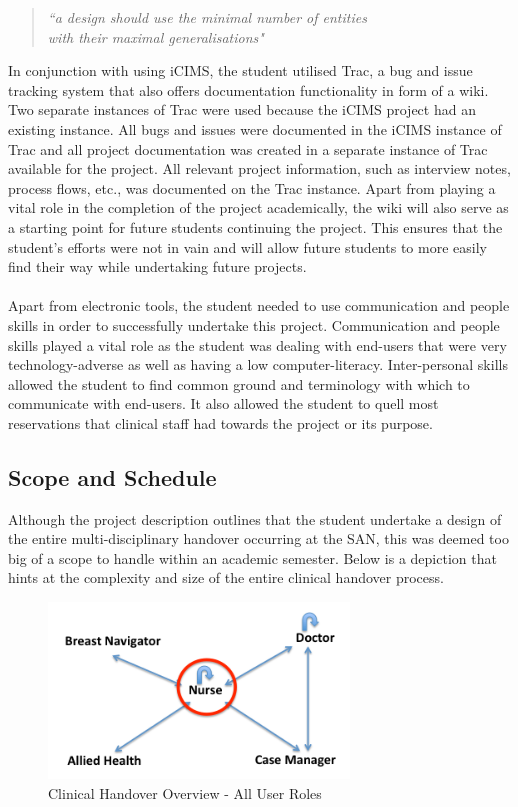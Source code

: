 \begin{quote}
\center\emph{``a design should use the minimal number of entities \\ with their maximal generalisations"}
\end{quote}
\vspace{6mm}
\noindent In conjunction with using iCIMS, the student utilised Trac, a bug and issue tracking system that also offers documentation functionality in form of a wiki. Two separate instances of Trac were used because the iCIMS project had an existing instance. All bugs and issues were documented in the iCIMS instance of Trac and all project documentation was created in a separate instance of Trac available for the project. All relevant project information, such as interview notes, process flows, etc., was documented on the Trac instance. Apart from playing a vital role in the completion of the project academically, the wiki will also serve as a starting point for future students continuing the project. This ensures that the student's efforts were not in vain and will allow future students to more easily find their way while undertaking future projects.
\\ \\
Apart from electronic tools, the student needed to use communication and people skills in order to successfully undertake this project. Communication and people skills played a vital role as the student was dealing with end-users that were very technology-adverse as well as having a low computer-literacy. Inter-personal skills allowed the student to find common ground and terminology with which to communicate with end-users. It also allowed the student to quell most reservations that clinical staff had towards the project or its purpose.

\newpage
\subsection{Scope and Schedule}
Although the project description outlines that the student undertake a design of the entire multi-disciplinary handover occurring at the SAN, this was deemed too big of a scope to handle within an academic semester. Below is a depiction that hints at the complexity and size of the entire clinical handover process.

\begin{figure}[hp]
				\centering
				\includegraphics[scale=1.0, width=80mm]{Images/Clinical_Handover_All_Roles}
				\caption{Clinical Handover Overview - All User Roles}
\end{figure} 

